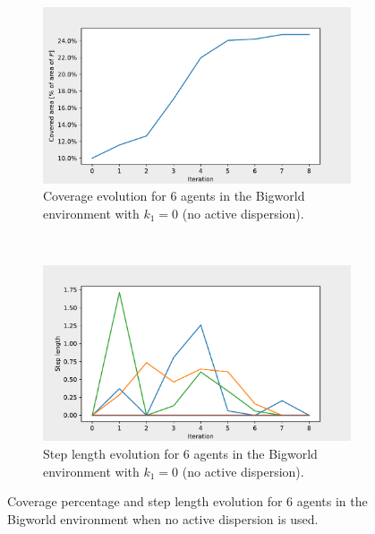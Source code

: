 \begin{figure}[H]
  \centering
  \begin{subfigure}[t]{0.5\textwidth}
    \centering
    \includegraphics[width=\textwidth]{figs/bigworld_6_agnt_k_1_0_k_2_1_area_traj.pdf}
    \caption{Coverage evolution for 6 agents in the Bigworld environment with $k_{1} = 0$ (no active dispersion).}
    \label{fig:6_agnt_bw_k_1_0_a_traj}
  \end{subfigure}%
  ~ 
  \begin{subfigure}[t]{0.5\textwidth}
    \centering
    \includegraphics[width=\textwidth]{figs/bigworld_6_agnt_k_1_0_k_2_1_step_traj.pdf}
    \caption{Step length evolution for 6 agents in the Bigworld environment with $k_{1} = 0$ (no active dispersion).}
    \label{fig:6_agnt_bw_k_1_0_s_traj}
  \end{subfigure}
  \caption{Coverage percentage and step length evolution for 6 agents in the Bigworld environment when no active dispersion is used.}
  \label{fig:6_agnt_bw_evolution}
\end{figure}


